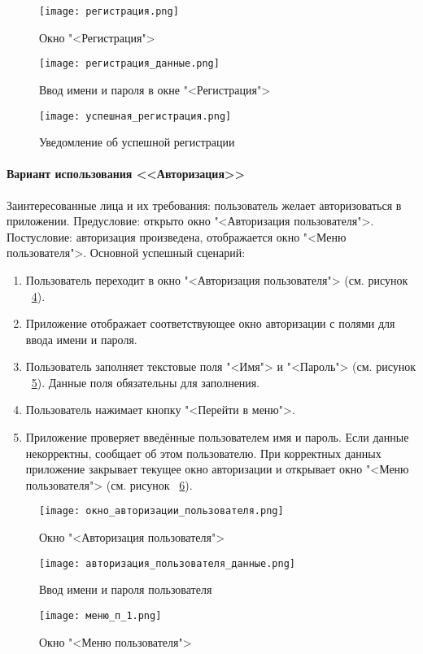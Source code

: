 \newpage
\begin{figure}[ht]
	\centering
	\texttt{[image: регистрация.png]}
	\caption{Окно "<Регистрация">}
	\label{reg_window:image}
\end{figure}
\begin{figure}[ht]
	\centering
	\texttt{[image: регистрация\_данные.png]}
	\caption{Ввод имени и пароля в окне "<Регистрация">}
	\label{reg_data:image}
\end{figure}
\begin{figure}[ht]
	\centering
	\texttt{[image: успешная\_регистрация.png]}
	\caption{Уведомление об успешной регистрации}
	\label{successful_reg:image}
\end{figure}

\paragraph{Вариант использования <<Авторизация>>}

Заинтересованные лица и их требования: пользователь желает авторизоваться в приложении.
\newline Предусловие: открыто окно "<Авторизация пользователя">.
\newline Постусловие: авторизация произведена, отображается окно "<Меню пользователя">.
\newline Основной успешный сценарий:
\begin{enumerate}
	\item Пользователь переходит в окно "<Авторизация пользователя"> (см. рисунок ~\ref{user_auth_window:image}).
	\item Приложение отображает соответствующее окно авторизации с полями для ввода имени и пароля.
	\item Пользователь заполняет текстовые поля "<Имя"> и "<Пароль"> (см. рисунок ~\ref{user_auth_data:image}). Данные поля обязательны для заполнения.
	\item Пользователь нажимает кнопку "<Перейти в меню">.
	\item Приложение проверяет введённые пользователем имя и пароль. Если данные некорректны, сообщает об этом пользователю. При корректных данных приложение закрывает текущее окно авторизации и открывает окно "<Меню пользователя"> (см. рисунок ~\ref{user_menu_1:image}).
\end{enumerate}

\begin{figure}[H]
	\centering
	\texttt{[image: окно\_авторизации\_пользователя.png]}
	\caption{Окно "<Авторизация пользователя">}
	\label{user_auth_window:image}
\end{figure}
\begin{figure}[H]
	\centering
	\texttt{[image: авторизация\_пользователя\_данные.png]}
	\caption{Ввод имени и пароля пользователя}
	\label{user_auth_data:image}
\end{figure}
\begin{figure}[H]
	\centering
	\texttt{[image: меню\_п\_1.png]}
	\caption{Окно "<Меню пользователя">}
	\label{user_menu_1:image}
\end{figure}

